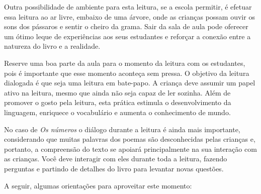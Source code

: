 \documentclass[11pt]{extarticle}
\begin{document}

Outra possibilidade de ambiente para esta leitura, se a escola permitir, 
é efetuar essa leitura ao ar livre, embaixo de uma árvore, onde as crianças 
possam ouvir os sons dos pássaros e sentir o cheiro da grama. Sair da sala 
de aula pode oferecer um ótimo leque de experiências aos seus estudantes e 
reforçar a conexão entre a natureza do livro e a realidade.  

Reserve uma boa parte da aula para o momento da leitura com os estudantes, 
pois é importante que esse momento aconteça sem pressa. O objetivo da 
leitura dialogada é que seja uma leitura em bate-papo. A criança deve 
assumir um papel ativo na leitura, mesmo que ainda não seja capaz de 
ler sozinha. Além de promover o gosto pela leitura, esta prática estimula 
o desenvolvimento da linguagem, enriquece o vocabulário e 
aumenta o conhecimento de mundo.

No caso de \textit{Os números} o diálogo durante a leitura é 
ainda mais importante, considerando que muitas palavras dos poemas são desconhecidas pelas crianças e, portanto, a compreensão do texto se apoiará principalmente na sua interação com as crianças. 
Você deve interagir com eles durante toda a 
leitura, fazendo perguntas e partindo de detalhes do livro para 
levantar novas questões. 

A seguir, algumas orientações para aproveitar este momento: 
\end{document}
